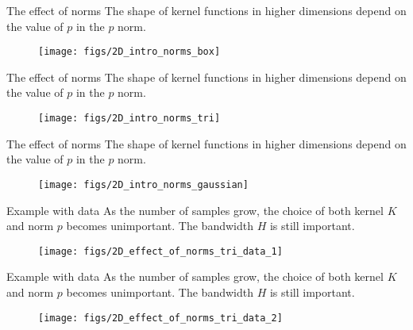 \documentclass[11pt, aspectratio=149]{beamer}
\theoremstyle{plain}
\begin{document}
\begin{frame}[fragile, t]{The effect of norms}
	The shape of kernel functions in higher dimensions depend on the value of $p$ in the $p$ norm.
	\vfill
	\begin{figure}
		\centering
		\texttt{[image: figs/2D\_intro\_norms\_box]}
	\end{figure}
\end{frame}

\begin{frame}[fragile, t]{The effect of norms}
	The shape of kernel functions in higher dimensions depend on the value of $p$ in the $p$ norm.
	\vfill
	\begin{figure}
		\centering
		\texttt{[image: figs/2D\_intro\_norms\_tri]}
	\end{figure}
\end{frame}

\begin{frame}[fragile, t]{The effect of norms}
	The shape of kernel functions in higher dimensions depend on the value of $p$ in the $p$ norm.
	\vfill
	\begin{figure}
		\centering
		\texttt{[image: figs/2D\_intro\_norms\_gaussian]}
	\end{figure}
\end{frame}


\begin{frame}[fragile, t]{Example with data}
	As the number of samples grow, the choice of both kernel $K$ and norm $p$ becomes unimportant. The bandwidth $H$ is still important.
	\vfill
	\begin{figure}
		\centering
		\texttt{[image: figs/2D\_effect\_of\_norms\_tri\_data\_1]}
	\end{figure}
\end{frame}


\begin{frame}[fragile, t]{Example with data}
	As the number of samples grow, the choice of both kernel $K$ and norm $p$ becomes unimportant. The bandwidth $H$ is still important.
	\vfill
	\begin{figure}
		\centering
		\texttt{[image: figs/2D\_effect\_of\_norms\_tri\_data\_2]}
	\end{figure}
\end{frame}
\end{document}
